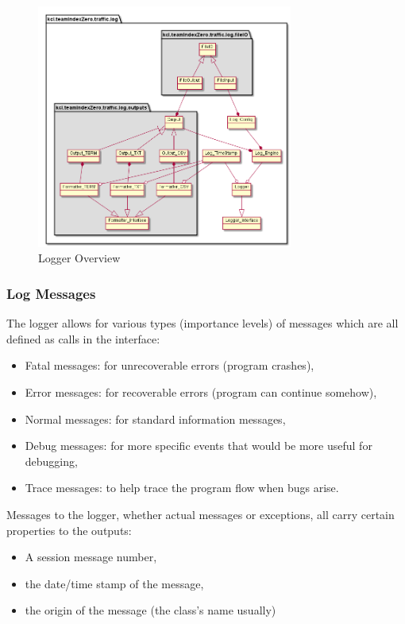\begin{figure}[!h]
	\vspace{1.5em}
  	\caption{Logger Overview}
  	\label{fig:logger_overview}
  	\centering
	\includegraphics[width=0.75\textwidth]{figs/logger/LogModuleObjectDiagram.png}
  	\vspace{1.5em}
\end{figure}

\subsubsection{Log Messages}
The logger allows for various types (importance levels) of messages which are all defined as calls in the interface:
\begin{itemize}
	\item Fatal messages: for unrecoverable errors (program crashes),
	\item Error messages: for recoverable errors (program can continue somehow),
	\item Normal messages: for standard information messages,
	\item Debug messages: for more specific events that would be more useful for debugging,
	\item Trace messages: to help trace the program flow when bugs arise.
\end{itemize}

Messages to the logger, whether actual messages or exceptions, all carry certain properties to the outputs:
\begin{itemize}
	\item A session message number,
	\item the date/time stamp of the message,
	\item the origin of the message (the class's name usually)
\end{itemize}

